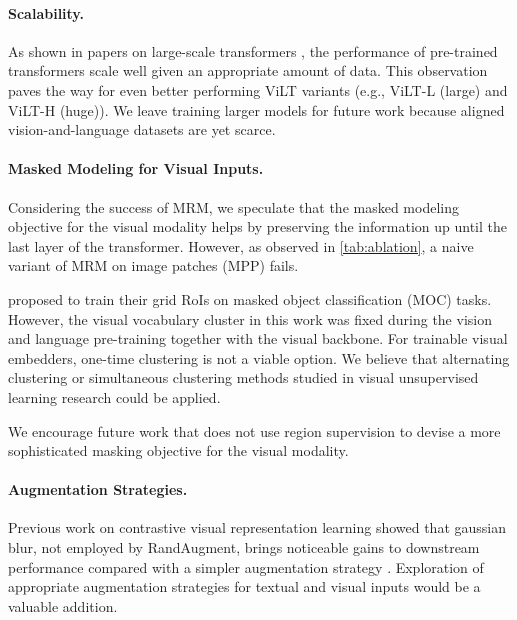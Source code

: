 \documentclass{article}
\begin{document}
\paragraph{Scalability.}
As shown in papers on large-scale transformers \citep{devlin2019bert,dosovitskiy2020image}, the performance of pre-trained transformers scale well given an appropriate amount of data. 
This observation paves the way for even better performing ViLT variants (e.g., ViLT-L (large) and ViLT-H (huge)).
We leave training larger models for future work because aligned vision-and-language datasets are yet scarce. 

\paragraph{Masked Modeling for Visual Inputs.}
Considering the success of MRM, we speculate that the masked modeling objective for the visual modality helps by preserving the information up until the last layer of the transformer. 
However, as observed in \cref{tab:ablation}, a naive variant of MRM on image patches (MPP) fails.

\citet{cho2020x} proposed to train their grid RoIs on masked object classification (MOC) tasks.
However, the visual vocabulary cluster in this work was fixed during the vision and language pre-training together with the visual backbone. For trainable visual embedders, one-time clustering is not a viable option.
We believe that alternating clustering \citep{caron2018deep,caron2019unsupervised} or simultaneous clustering \citep{asano2019self,caron2020unsupervised} methods studied in visual unsupervised learning research could be applied.

We encourage future work that does not use region supervision to devise a more sophisticated masking objective for the visual modality.

\paragraph{Augmentation Strategies.}
Previous work on contrastive visual representation learning \citep{chen2020simple, chen2020improved} showed that gaussian blur, not employed by RandAugment, brings noticeable gains to downstream performance compared with a simpler augmentation strategy \citep{he2020momentum}.
Exploration of appropriate augmentation strategies for textual and visual inputs would be a valuable addition.

\clearpage



\end{document}
